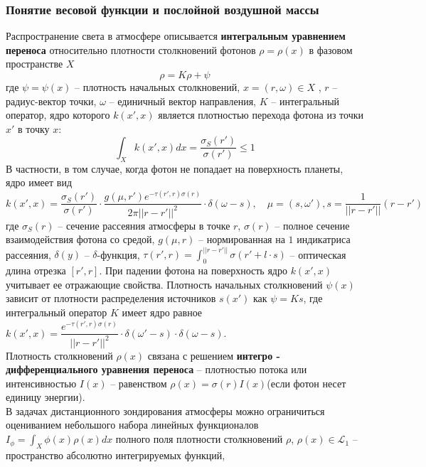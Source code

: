 \documentclass[a4paper,14pt]{article}
\theoremstyle{plain}
\theoremstyle{definition}
\theoremstyle{remark}
\newcommand{\nl}{\\ \indent}
\begin{document}
\subsubsection{Понятие весовой функции и послойной воздушной массы}
Распространение света в атмосфере описывается
\textbf{интегральным уравнением переноса} относительно 
плотности столкновений фотонов $\rho = \rho(x)$ 
в фазовом пространстве $X$
\begin{equation}
\rho = K \rho + \psi
\end{equation}
где $\psi = \psi(x)$ -- плотность начальных столкновений,
$x=(r, \omega) \in X$ , $r$ -- радиус-вектор точки,
$\omega$ -- единичный вектор направления, 
$K$ -- интегральный оператор, 
ядро которого $k(x', x)$  является плотностью перехода 
фотона из точки $x'$ в точку $x$:
\begin{equation}
\int_X k(x', x) dx =
\dfrac{\sigma_S(r')}{\sigma(r')} \leq 1
\end{equation}
В частности, в том случае, когда фотон не попадает на 
поверхность планеты, ядро имеет вид
\begin{equation}
k(x', x) =
\dfrac{\sigma_S(r')}{\sigma(r')}
\cdot
\dfrac{
g(\mu, r') e^{-\tau(r', r) \sigma(r)}}{
2 \pi ||r - r'||^2}
\cdot
\delta(\omega - s) , \quad 
\mu = (s, \omega'),
s = \dfrac{1}{||r - r'||}(r - r')
\label{eq_kernel}
\end{equation}
где $\sigma_S(r)$ -- сечение рассеяния атмосферы в точке $r$,
$\sigma(r)$ -- полное сечение взаимодействия фотона со средой,
$g(\mu, r)$ -- нормированная на $1$ индикатриса рассеяния, 
$\delta(y)$ -- $\delta$-функция, 
$\tau(r', r) = \int_0^{||r-r'||}\sigma(r' + l \cdot s)$ --
оптическая длина отрезка $[r', r]$. 
При падении фотона на поверхность ядро $k(x', x)$ учитывает ее
отражающие свойства. 
Плотность начальных столкновений $\psi(x)$ зависит от плотности
распределения источников $s(x')$ как $\psi = Ks$, 
где интегральный оператор $K$ имеет ядро равное 
$k(x', x) = \dfrac{e^{- \tau(r', r) \sigma(r)}}{
||r - r'||^2
} \cdot \delta(\omega' - s) \cdot \delta(\omega - s)$.
\nl
Плотность столкновений $\rho(x)$ связана с решением 
\textbf{интегро - дифференциального уравнения переноса} --
плотностью потока или интенсивностью $I(x)$ -- равенством 
$\rho(x) = \sigma(r) I(x)$(если фотон несет единицу энергии).
\nl
В задачах дистанционного зондирования атмосферы можно
ограничиться оцениванием небольшого набора линейных функционалов 
$I_{\phi} = \int_X \phi(x) \rho(x) dx$ полного поля плотности
столкновений $\rho$, $\rho(x) \in \mathcal{L}_1$ -- пространство
абсолютно интегрируемых функций, 
\end{document}
